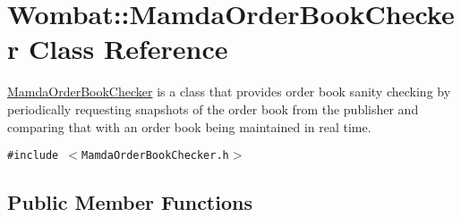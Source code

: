 \hypertarget{classWombat_1_1MamdaOrderBookChecker}{
\section{Wombat::Mamda\-Order\-Book\-Checker Class Reference}
\label{classWombat_1_1MamdaOrderBookChecker}
}
\hyperlink{classWombat_1_1MamdaOrderBookChecker}{Mamda\-Order\-Book\-Checker} is a class that provides order book sanity checking by periodically requesting snapshots of the order book from the publisher and comparing that with an order book being maintained in real time.  


{\tt \#include $<$Mamda\-Order\-Book\-Checker.h$>$}

\subsection*{Public Member Functions}
